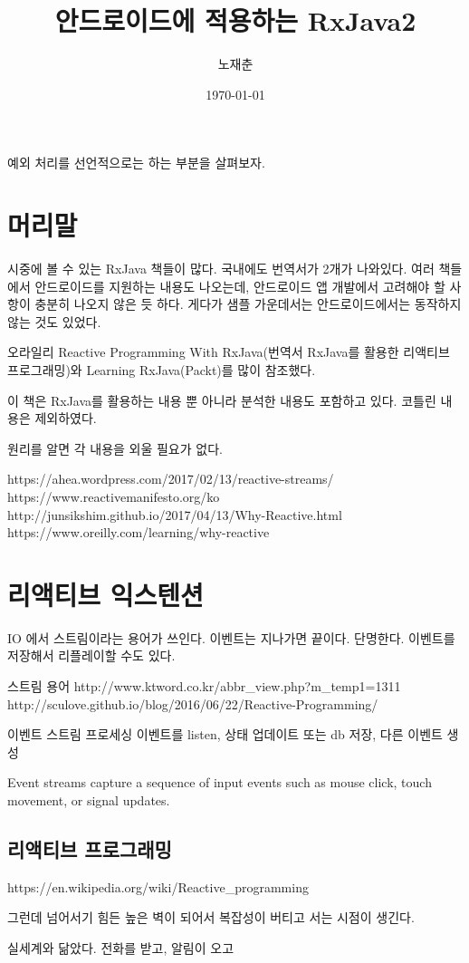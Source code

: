 \documentclass{book}
\title{안드로이드에 적용하는 RxJava2}
\author{노재춘}
\date{\today}
\begin{document}
 
\maketitle
예외 처리를 선언적으로는 하는 부분을 살펴보자.
\chapter*{머리말}
시중에 볼 수 있는 RxJava 책들이 많다. 국내에도 번역서가 2개가 나와있다. 
여러 책들에서 안드로이드를 지원하는 내용도 나오는데, 안드로이드 앱 개발에서 고려해야 할 사항이 충분히 나오지 않은 듯 하다. 게다가 샘플 가운데서는 안드로이드에서는 동작하지 않는 것도 있었다.

오라일리 Reactive Programming With RxJava(번역서 RxJava를 활용한 리액티브 프로그래밍)와 Learning RxJava(Packt)를 많이 참조했다.

이 책은 RxJava를 활용하는 내용 뿐 아니라 분석한 내용도 포함하고 있다.
코틀린 내용은 제외하였다.

원리를 알면 각 내용을 외울 필요가 없다. 
\tableofcontents

https://ahea.wordpress.com/2017/02/13/reactive-streams/
https://www.reactivemanifesto.org/ko
http://junsikshim.github.io/2017/04/13/Why-Reactive.html
https://www.oreilly.com/learning/why-reactive

\chapter{리액티브 익스텐션}
IO 에서 스트림이라는 용어가 쓰인다.
이벤트는 지나가면 끝이다. 단명한다. 이벤트를 저장해서 리플레이할 수도 있다.

스트림 용어
http://www.ktword.co.kr/abbr_view.php?m_temp1=1311
http://sculove.github.io/blog/2016/06/22/Reactive-Programming/

이벤트 스트림 프로세싱
이벤트를 listen, 상태 업데이트 또는 db 저장, 다른 이벤트 생성

Event streams capture a sequence of input events such as mouse click, touch movement, or signal updates.

\section{리액티브 프로그래밍}
https://en.wikipedia.org/wiki/Reactive_programming

그런데 넘어서기 힘든 높은 벽이 되어서 복잡성이 버티고 서는 시점이 생긴다.

실세계와 닮았다.
전화를 받고, 알림이 오고
\end{document}
